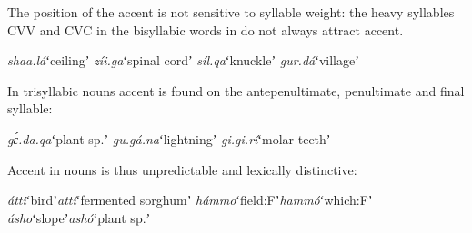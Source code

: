 \documentclass[output=paper,modfonts,nonflat,hidelinks]{langsci/langscibook}
\begin{document}
The position of the accent is not sensitive to syllable weight: the heavy syllables CVV and CVC in the bisyllabic words in  do not always attract accent.

\begin{exe}
	\ex \label{ex:Petrollino:lexicalstress} \begin{xlist}
	\ex \textit{shaa.lá}\hspace{7mm}ʻceilingʼ
    \ex \textit{zíi.ga}\hspace{10mm}ʻspinal cordʼ
    \ex \textit{síl.qa}\hspace{10mm}ʻknuckleʼ
    \ex \textit{gur.dá}\hspace{9mm}ʻvillageʼ
    \end{xlist}
\end{exe}
In trisyllabic nouns accent is found on the antepenultimate, penultimate and final syllable:

\begin{exe}
	\ex \begin{xlist}
	\ex \textit{gɛ́.da.qa}\hspace{4mm}ʻplant sp.ʼ
    \ex \textit{gu.gá.na}\hspace{4mm}ʻlightningʼ
    \ex \textit{gi.gi.rí}\hspace{7mm}ʻmolar teethʼ
    \end{xlist}
\end{exe}
Accent in nouns is thus unpredictable and lexically distinctive: 

\begin{exe}
	\ex \begin{xlist}
	\ex \textit{átti}\hspace{12mm}ʻbirdʼ\hspace{10mm}\textit{attí}\hspace{10mm}ʻfermented sorghumʼ
    \ex \textit{hámmo}\hspace{6mm}ʻfield:Fʼ\hspace{6mm}\textit{hammó}\hspace{5mm}ʻwhich:Fʼ
    \ex \textit{ásho}\hspace{11mm}ʻslopeʼ\hspace{8mm}\textit{ashó}\hspace{9mm}ʻplant sp.ʼ
\end{xlist} \label{ex:Petrollino:minimalpairs1}
\end{exe}
\end{document}
